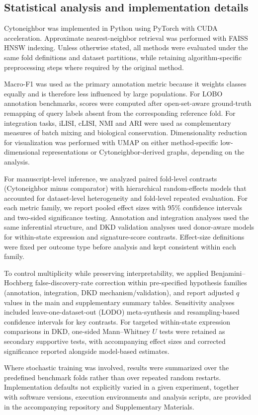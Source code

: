 \documentclass[11pt]{article}
\begin{document}
\subsection{Statistical analysis and implementation details}

Cytoneighbor was implemented in Python using PyTorch with CUDA acceleration. Approximate nearest-neighbor retrieval was performed with FAISS HNSW indexing. Unless otherwise stated, all methods were evaluated under the same fold definitions and dataset partitions, while retaining algorithm-specific preprocessing steps where required by the original method.

Macro-F1 was used as the primary annotation metric because it weights classes equally and is therefore less influenced by large populations. For LOBO annotation benchmarks, scores were computed after open-set-aware ground-truth remapping of query labels absent from the corresponding reference fold. For integration tasks, iLISI, cLISI, NMI and ARI were used as complementary measures of batch mixing and biological conservation. Dimensionality reduction for visualization was performed with UMAP on either method-specific low-dimensional representations or Cytoneighbor-derived graphs, depending on the analysis\cite{McInnes2018UMAP}.

For manuscript-level inference, we analyzed paired fold-level contrasts (Cytoneighbor minus comparator) with hierarchical random-effects models that accounted for dataset-level heterogeneity and fold-level repeated evaluation. For each metric family, we report pooled effect sizes with 95\% confidence intervals and two-sided significance testing. Annotation and integration analyses used the same inferential structure, and DKD validation analyses used donor-aware models for within-state expression and signature-score contrasts. Effect-size definitions were fixed per outcome type before analysis and kept consistent within each family.

To control multiplicity while preserving interpretability, we applied Benjamini--Hochberg false-discovery-rate correction within pre-specified hypothesis families (annotation, integration, DKD mechanism/validation), and report adjusted $q$ values in the main and supplementary summary tables. Sensitivity analyses included leave-one-dataset-out (LODO) meta-synthesis and resampling-based confidence intervals for key contrasts. For targeted within-state expression comparisons in DKD, one-sided Mann--Whitney $U$ tests were retained as secondary supportive tests, with accompanying effect sizes and corrected significance reported alongside model-based estimates.

Where stochastic training was involved, results were summarized over the predefined benchmark folds rather than over repeated random restarts. Implementation defaults not explicitly varied in a given experiment, together with software versions, execution environments and analysis scripts, are provided in the accompanying repository and Supplementary Materials.




\end{document}
